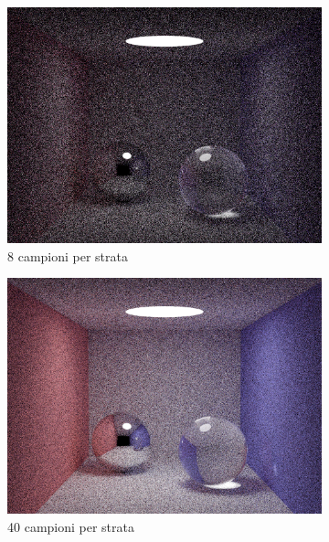 \begin{figure}[tb]
    \begin{subfigure}[c]{0.4\linewidth}
	\centering
	\includegraphics[width=\linewidth]{../assets/appendixD_result_8.png}
	\caption{8 campioni per strata}
    \end{subfigure}\hspace{12pt}
    \begin{subfigure}[c]{0.4\linewidth}
	\centering
	\includegraphics[width=\linewidth]{../assets/appendixD_result_40.png}
	\caption{40 campioni per strata}
    \end{subfigure}\hfill
    \begin{subfigure}[c]{0.4\linewidth}

\end{subfigure}
\end{figure}
